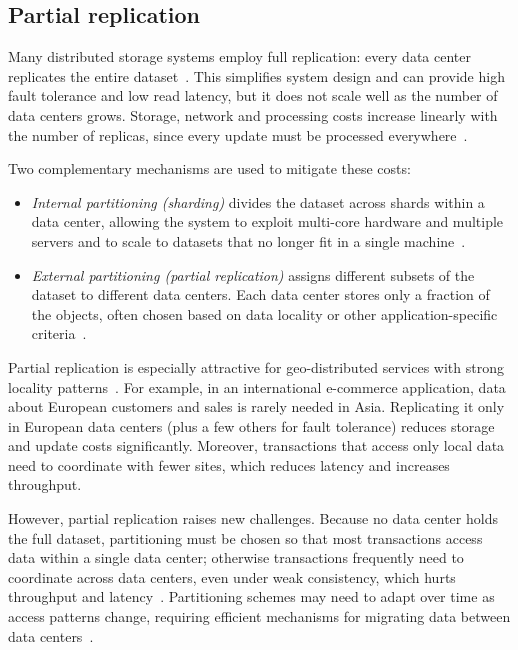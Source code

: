 \subsection{Partial replication}
\label{subsec:partial}

Many distributed storage systems employ full replication: every data center
replicates the entire dataset~\cite{dynamo,cure}. This simplifies
system design and can provide high fault tolerance and low read latency, but it
does not scale well as the number of data centers grows. Storage, network and
processing costs increase linearly with the number of replicas, since every
update must be processed everywhere~\cite{bailis2013eventually,zhang2013towards}.

Two complementary mechanisms are used to mitigate these costs:

\begin{itemize}
  \item \emph{Internal partitioning (sharding)} divides the dataset across
        shards within a data center, allowing the system to exploit multi-core
        hardware and multiple servers and to scale to datasets that no longer
        fit in a single machine~\cite{dynamo,bailis2013eventually}.
  \item \emph{External partitioning (partial replication)} assigns different
        subsets of the dataset to different data centers. Each data center
        stores only a fraction of the objects, often chosen based on data
        locality or other application-specific criteria~\cite{spanner,walter,zhang2013towards}.
\end{itemize}

Partial replication is especially attractive for geo-distributed services with
strong locality patterns~\cite{walter,zhang2013towards}. For example, in an
international e-commerce application, data about European customers and sales is
rarely needed in Asia. Replicating it only in European data centers (plus a few
others for fault tolerance) reduces storage and update costs significantly.
Moreover, transactions that access only local data need to coordinate with fewer
sites, which reduces latency and increases throughput.

However, partial replication raises new challenges. Because no data center holds
the full dataset, partitioning must be chosen so that most transactions access
data within a single data center; otherwise transactions frequently need to
coordinate across data centers, even under weak consistency, which hurts
throughput and latency~\cite{walter,spanner,zhang2013towards}. Partitioning
schemes may need to adapt over time as access patterns change, requiring
efficient mechanisms for migrating data between data centers~\cite{zhang2013towards,irwin2010fly}.

